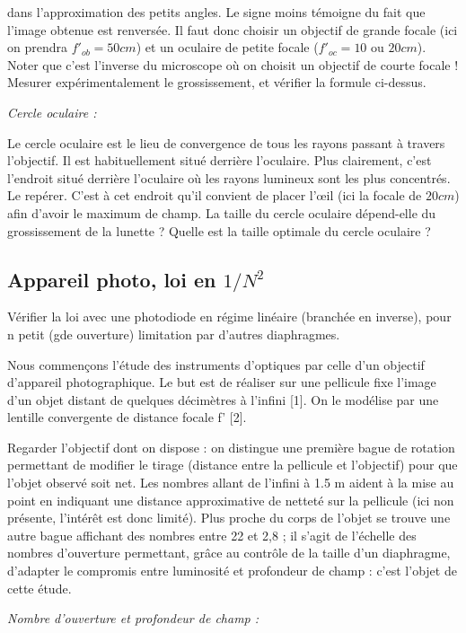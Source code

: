 \documentclass{article}%
\begin{document}
dans l'approximation des petits angles. Le signe moins témoigne du fait que l'image obtenue est renversée. Il faut donc choisir un objectif de grande focale (ici on prendra $f'_{ob}=50 cm$) et un oculaire de petite focale ($f'_{oc}=10$ ou $20 cm$). Noter que c'est l'inverse du microscope où on choisit un objectif de courte focale ! Mesurer expérimentalement le grossissement, et vérifier la formule ci-dessus.

\textit{Cercle oculaire :}

Le cercle oculaire est le lieu de convergence de tous les rayons passant à travers l'objectif. Il est habituellement situé derrière l'oculaire. Plus clairement, c'est l'endroit situé derrière l'oculaire où les rayons lumineux sont les plus concentrés. Le repérer. C'est à cet endroit qu'il convient de placer l’œil (ici la focale de $20 cm$) afin d'avoir le maximum de champ. La taille du cercle oculaire dépend-elle du grossissement de la lunette ? Quelle est la taille optimale du cercle oculaire ?


\subsection{Appareil photo, loi en $1/N^2$}

Vérifier la loi avec une photodiode en régime linéaire (branchée en inverse), pour n petit (gde ouverture) limitation par d'autres diaphragmes.

Nous commençons l'étude des instruments d'optiques par celle d'un objectif d'appareil photographique. Le but est de réaliser sur une pellicule fixe l'image d'un objet distant de quelques décimètres à l'infini [1]. On le modélise par une lentille convergente de distance focale f' [2].

Regarder l'objectif dont on dispose : on distingue une première bague de rotation permettant de modifier le tirage (distance entre la pellicule et l'objectif) pour que l'objet observé soit net. Les nombres allant de l'infini à 1.5 m aident à la mise au point en indiquant une distance approximative de netteté sur la pellicule (ici non présente, l'intérêt est donc limité). Plus proche du corps de l'objet se trouve une autre bague affichant des nombres entre 22 et 2,8 ; il s'agit de l'échelle des nombres d'ouverture permettant, grâce au contrôle de la taille d'un diaphragme, d'adapter le compromis entre luminosité et profondeur de champ : c'est l'objet de cette étude.

\textit{Nombre d'ouverture et profondeur de champ :}
\end{document}
